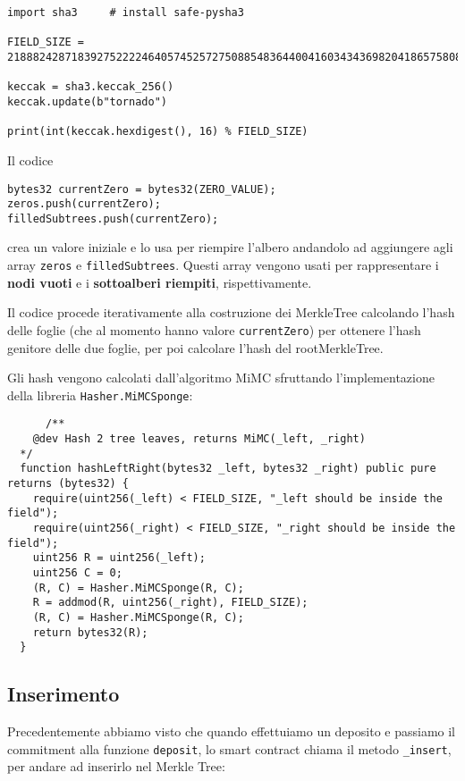 \begin{lstlisting}
import sha3     # install safe-pysha3

FIELD_SIZE = 21888242871839275222246405745257275088548364400416034343698204186575808495617

keccak = sha3.keccak_256()
keccak.update(b"tornado")

print(int(keccak.hexdigest(), 16) % FIELD_SIZE)
\end{lstlisting}

Il codice
\begin{lstlisting}
bytes32 currentZero = bytes32(ZERO_VALUE);
zeros.push(currentZero);
filledSubtrees.push(currentZero);
\end{lstlisting}
crea un valore iniziale e lo usa per riempire l'albero andandolo ad aggiungere agli array \verb|zeros| e \verb|filledSubtrees|. Questi array vengono usati per rappresentare i \textbf{nodi vuoti} e i \textbf{sottoalberi riempiti}, rispettivamente.

Il codice procede iterativamente alla costruzione dei MerkleTree calcolando l'hash delle foglie (che al momento hanno valore \verb|currentZero|) per ottenere l'hash genitore delle due foglie, per poi calcolare l'hash del rootMerkleTree.

Gli hash vengono calcolati dall'algoritmo MiMC sfruttando l'implementazione della libreria \verb|Hasher.MiMCSponge|:

\begin{lstlisting}
      /**
    @dev Hash 2 tree leaves, returns MiMC(_left, _right)
  */
  function hashLeftRight(bytes32 _left, bytes32 _right) public pure returns (bytes32) {
    require(uint256(_left) < FIELD_SIZE, "_left should be inside the field");
    require(uint256(_right) < FIELD_SIZE, "_right should be inside the field");
    uint256 R = uint256(_left);
    uint256 C = 0;
    (R, C) = Hasher.MiMCSponge(R, C);
    R = addmod(R, uint256(_right), FIELD_SIZE);
    (R, C) = Hasher.MiMCSponge(R, C);
    return bytes32(R);
  }
\end{lstlisting}

\subsection{Inserimento}

Precedentemente abbiamo visto che quando effettuiamo un deposito e passiamo il commitment alla funzione \verb|deposit|, lo smart contract chiama il metodo \verb|_insert|, per andare ad inserirlo nel Merkle Tree:

